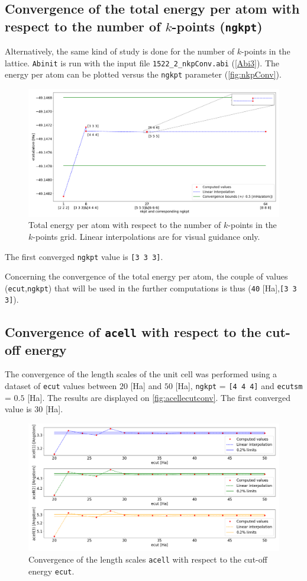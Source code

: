 \documentclass[11pt,a4paper]{article}
\begin{document}
\subsection{Convergence of the total energy per atom with respect to the number of $k$-points (\texttt{ngkpt})}
\label{convEtotNkpt}
Alternatively, the same kind of study is done for the number of $k$-points in the lattice. \texttt{Abinit} is run with the input file \texttt{1522\_2\_nkpConv.abi} (\autoref{Abi3}). The energy per atom can be plotted versus the \texttt{ngkpt} parameter (\autoref{fig:nkpConv}).
\begin{figure}[H]
\includegraphics[width=\textwidth]{images/etotngkpt.png}
\caption{Total energy per atom with respect to the number of $k$-points in the $k$-points grid.
Linear interpolations are for visual guidance only.}
\label{fig:nkpConv}
\end{figure}
The first converged \texttt{ngkpt} value is \texttt{[3 3 3]}.

Concerning the convergence of the total energy per atom, the couple of values (\texttt{ecut},\texttt{ngkpt}) that will be used in the further computations is thus (\texttt{40} [Ha],\texttt{[3 3 3]}).
\subsection{Convergence of \texttt{acell} with respect to the cut-off energy}
The convergence of the length scales of the unit cell was performed using a dataset of \texttt{ecut} values between $20$ [Ha] and $50$ [Ha], \texttt{ngkpt} = \texttt{[4 4 4]} and \texttt{ecutsm} = $0.5$ [Ha]. The results are displayed on \autoref{fig:acellecutconv}.
The first converged value is $30$ [Ha].
\begin{figure}
\centering
\includegraphics[width=\textwidth]{images/acellConv.png}
\caption{Convergence of the length scales \texttt{acell} with respect to the cut-off energy \texttt{ecut}.}
\label{fig:acellecutconv}
\end{figure}
\end{document}
